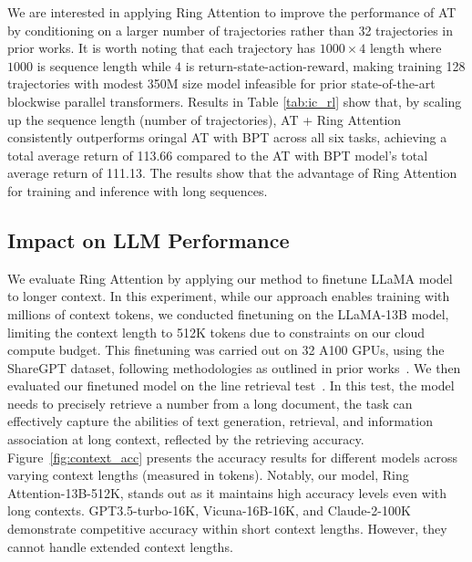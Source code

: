 We are interested in applying {Ring Attention} to improve the performance of AT by conditioning on a larger number of trajectories rather than 32 trajectories in prior works. It is worth noting that each trajectory has $1000 \times 4$ length where $1000$ is sequence length while $4$ is return-state-action-reward, making training 128 trajectories with modest 350M size model infeasible for prior state-of-the-art blockwise parallel transformers. Results in Table \ref{tab:ic_rl} show that, by scaling up the sequence length (number of trajectories), AT + {Ring Attention} consistently outperforms oringal AT with BPT across all six tasks, achieving a total average return of 113.66 compared to the AT with BPT model's total average return of 111.13. The results show that the advantage of {Ring Attention} for training and inference with long sequences.

\subsection{Impact on LLM Performance}
\label{sec:llm}
We evaluate {Ring Attention} by applying our method to finetune LLaMA model to longer context. In this experiment, while our approach enables training with millions of context tokens, we conducted finetuning on the LLaMA-13B model, limiting the context length to 512K tokens due to constraints on our cloud compute budget. This finetuning was carried out on 32 A100 GPUs, using the ShareGPT dataset, following methodologies as outlined in prior works~\citep{chiang2023vicuna,geng2023koala}. We then evaluated our finetuned model on the line retrieval test~\citep{longchat2023}. In this test, the model needs to precisely retrieve a number from a long document, the task can effectively capture the abilities of text generation, retrieval, and information association at long context, reflected by the retrieving accuracy.
Figure~\ref{fig:context_acc} presents the accuracy results for different models across varying context lengths (measured in tokens). Notably, our model, Ring Attention-13B-512K, stands out as it maintains high accuracy levels even with long contexts. GPT3.5-turbo-16K, Vicuna-16B-16K, and  Claude-2-100K demonstrate competitive accuracy within short context lengths. However, they cannot handle extended context lengths.


